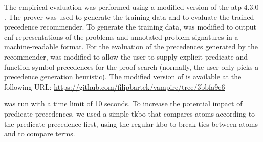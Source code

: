 The empirical evaluation was performed using a modified version of the \gls{atp} \Vampire{} 4.3.0 \cite{10.1007/978-3-642-39799-8_1}.
The prover was used to generate the training data and to evaluate the trained precedence recommender.
To generate the training data,
\Vampire{} was modified to output \gls{cnf} representations of the problems
and annotated problem signatures in a machine-readable format.
For the evaluation of the precedences generated by the recommender,
\Vampire{} was modified to allow the user to supply explicit predicate and function symbol precedences for the proof search
(normally, the user only picks a precedence generation heuristic).
The modified version of \Vampire{} is available at the following URL:
\url{https://github.com/filipbartek/vampire/tree/3bbfa9e6}


\Vampire{} was run with a time limit of 10 seconds.
To increase the potential impact of predicate precedences,
we used a simple \gls{tkbo} \cite{Ludwig2007,Kovacs2011}
that compares atoms according to the predicate precedence first,
using the regular \gls{kbo} to break ties between atoms
and to compare terms.



